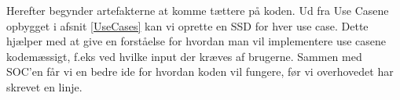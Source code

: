 Herefter begynder artefakterne at komme tættere på koden. Ud fra Use Casene opbygget i afsnit \ref{UseCases} kan vi oprette en SSD for hver use case. Dette hjælper med at give en forståelse for hvordan man vil implementere use casene kodemæssigt, f.eks ved hvilke input der kræves af brugerne. Sammen med SOC'en får vi en bedre ide for hvordan koden vil fungere, før vi overhovedet har skrevet en linje.

